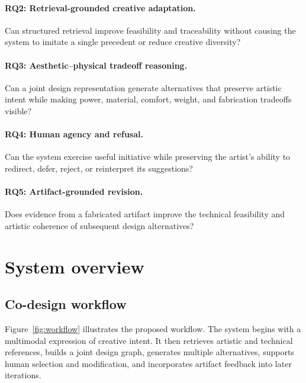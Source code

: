 \documentclass{article}
\begin{document}
\paragraph{RQ2: Retrieval-grounded creative adaptation.}
Can structured retrieval improve feasibility and traceability without causing
the system to imitate a single precedent or reduce creative diversity?

\paragraph{RQ3: Aesthetic--physical tradeoff reasoning.}
Can a joint design representation generate alternatives that preserve artistic
intent while making power, material, comfort, weight, and fabrication
tradeoffs visible?

\paragraph{RQ4: Human agency and refusal.}
Can the system exercise useful initiative while preserving the artist's ability
to redirect, defer, reject, or reinterpret its suggestions?

\paragraph{RQ5: Artifact-grounded revision.}
Does evidence from a fabricated artifact improve the technical feasibility and
artistic coherence of subsequent design alternatives?

\section{System overview}

\subsection{Co-design workflow}

Figure~\ref{fig:workflow} illustrates the proposed workflow. The system begins
with a multimodal expression of creative intent. It then retrieves artistic and
technical references, builds a joint design graph, generates multiple
alternatives, supports human selection and modification, and incorporates
artifact feedback into later iterations.
\end{document}
